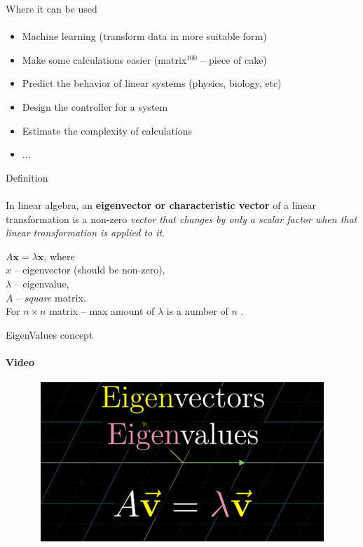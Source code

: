 \documentclass[aspectratio=169]{beamer}
\begin{document}
\begin{frame}[t]{Where it can be used}
\framesubtitle{}
\Large
    \begin{itemize}
        \item Machine learning (transform data in more suitable form)
        \item Make some calculations easier (matrix$^{100}$ – piece of cake)
        \item Predict the behavior of linear systems (physics, biology, etc)
        \item Design the controller for a system
        \item Estimate the complexity of calculations
        \item ...
    \end{itemize}
\end{frame}

\begin{frame}[t]{Definition}
\framesubtitle{}
\Large 
In linear algebra, an \textbf{eigenvector or characteristic vector }of a linear transformation is a non-zero \textit{vector that changes by only a scalar factor when that linear transformation is applied to it}. 
\bigskip

$ A\mathbf{x}=\lambda\mathbf{x}$, where \\ 
$x$ -- eigenvector (should be non-zero), \\ 
$\lambda$ -- eigenvalue, \\ 
$A$ -- \textit{square} matrix. \\ 
For $n \times n$ matrix -- max amount of $\lambda$ is a number of $n$ .
\end{frame}


\begin{frame}[t]{EigenValues concept}
    \framesubtitle{Video}
    \vspace{-0.6cm}
    \begin{figure}[H]
        \href{https://youtu.be/PFDu9oVAE-g}{
            \centering\includegraphics[height=6cm,width=1\textwidth,keepaspectratio]{eigenvideo_brown.jpg}}
        \label{fig:eigenvideo_brown.jpg}
    \end{figure}
\end{frame}
\end{document}
